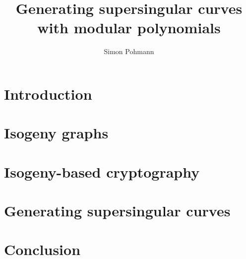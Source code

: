 \documentclass{ociamthesis}
\title{Generating supersingular curves with modular polynomials}
\author{Simon Pohmann}
\theoremstyle{definition}
\begin{document}
\maketitle




\begin{romanpages}
    \tableofcontents
\end{romanpages}

\chapter{Introduction}



\chapter{Isogeny graphs}



\chapter{Isogeny-based cryptography}



\chapter{Generating supersingular curves}



\chapter{Conclusion}



\printbibliography
\end{document}
